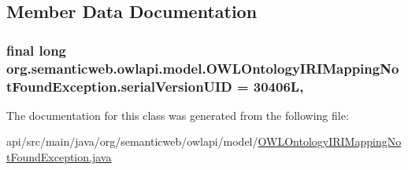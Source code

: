 \subsection{Member Data Documentation}
\hypertarget{classorg_1_1semanticweb_1_1owlapi_1_1model_1_1_o_w_l_ontology_i_r_i_mapping_not_found_exception_a8d24bf51cb342d55bfcdefcfaef82d10}{
\subsubsection[{serial\-Version\-U\-I\-D}]{\setlength{\rightskip}{0pt plus 5cm}final long org.\-semanticweb.\-owlapi.\-model.\-O\-W\-L\-Ontology\-I\-R\-I\-Mapping\-Not\-Found\-Exception.\-serial\-Version\-U\-I\-D = 30406\-L\hspace{0.3cm}{\ttfamily [static]}, {\ttfamily [private]}}}\label{classorg_1_1semanticweb_1_1owlapi_1_1model_1_1_o_w_l_ontology_i_r_i_mapping_not_found_exception_a8d24bf51cb342d55bfcdefcfaef82d10}


The documentation for this class was generated from the following file\-:\begin{DoxyCompactItemize}
\item 
api/src/main/java/org/semanticweb/owlapi/model/\hyperlink{_o_w_l_ontology_i_r_i_mapping_not_found_exception_8java}{O\-W\-L\-Ontology\-I\-R\-I\-Mapping\-Not\-Found\-Exception.\-java}\end{DoxyCompactItemize}
